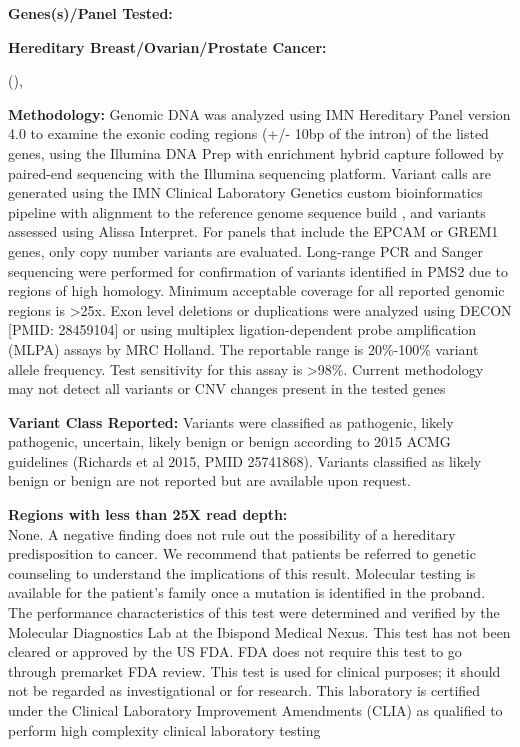 \documentclass[9pt]{extarticle}
\newcommand{\data}[1]{}
\newenvironment{dataiter}[1]{}{}
\begin{document}
\begin{flushleft}
{\bf Genes(s)/Panel Tested:}

{\bf Hereditary Breast/Ovarian/Prostate Cancer:}

\begin{dataiter}{tested_genes}
  \data{gene_symbol} (\data{refseq_mrna}),\end{dataiter}

{\bf Methodology: } Genomic DNA was analyzed using IMN Hereditary Panel version 4.0 to examine the exonic coding regions (+/- 10bp of the intron) of the listed genes, using the Illumina DNA Prep with enrichment hybrid capture followed by paired-end sequencing with the Illumina sequencing platform. Variant calls are generated using the IMN Clinical Laboratory Genetics custom bioinformatics pipeline with alignment to the reference genome sequence build \data{reference_genome}, and variants assessed using Alissa Interpret. For panels that include the EPCAM or GREM1 genes, only copy number variants are evaluated. Long-range PCR and Sanger sequencing were performed for confirmation of variants identified in PMS2 due to regions of high homology. Minimum acceptable coverage for all reported genomic regions is >25x. Exon level deletions or duplications were analyzed using DECON [PMID: 28459104] or using multiplex ligation-dependent probe amplification (MLPA) assays by MRC Holland. The reportable range is 20\%-100\% variant allele frequency. Test sensitivity for this assay is >98\%. Current methodology may not detect all variants or CNV changes present in the tested genes

{\bf Variant Class Reported: } Variants were classified as pathogenic, likely pathogenic, uncertain, likely benign or benign according to 2015 ACMG guidelines (Richards et al 2015, PMID 25741868). Variants classified as likely benign or benign are not reported but are available upon request. 

{\bf Regions with less than 25X read depth: \\}
None. 
\newline
\newline
A negative finding does not rule out the possibility of a hereditary predisposition to cancer. We recommend that patients be referred to genetic counseling to understand the implications of this result. Molecular testing is available for the patient's family once a mutation is identified in the proband. 
\newline
\newline
The performance characteristics of this test were determined and verified by the Molecular Diagnostics Lab at the Ibispond Medical Nexus. This test has not been cleared or approved by the US FDA. FDA does not require this test to go through premarket FDA review. This test is used for clinical purposes; it should not be regarded as investigational or for research. This laboratory is certified under the Clinical Laboratory Improvement Amendments (CLIA) as qualified to perform high complexity clinical laboratory testing
\end{flushleft}
\end{document}
